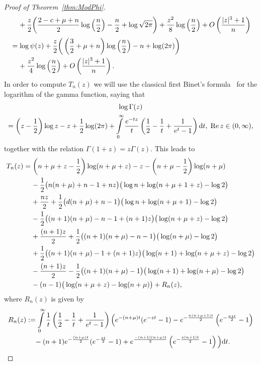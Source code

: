 \documentclass[AHL,Unicode,longabstracts,published]{cedram}
\newcommand{\dd}{{\rm d}}
\renewcommand{\Re}{\text{Re}\,}
\begin{document}
\begin{proof}[Proof of Theorem~\ref{thm:ModPhi}]
\begin{align*}
&\mkern20mu +\frac{z}{2}\bigg(\frac{2-c+\mu+n}{2}\log\left(\frac{n}{2}\right)-\frac{n}{2}+\log\sqrt{2\pi}\bigg)+\frac{z^2}{8}\log\left(\frac{n}{2}\right)+O\left(\frac{|z|^3+1}{n}\right)\\[0.20em]
&=\log \psi(z)+ \frac{z}{2}\bigg(\left(\frac{3}{2}+\mu+n\right)\log\left(\frac{n}{2}\right)-n+\log(2\pi)\bigg)\\
&\mkern20mu +\frac{z^2}{4}\log\left(\frac{n}{2}\right)+O\left(\frac{|z|^3+1}{n}\right).
\end{align*}
In order to compute $T_n(z)$ we will use the classical first Binet's formula~\cite[p.~243]{WW} for the logarithm of the gamma function, saying that
\begin{multline*}
\log \Gamma(z)\\
=\left(z-\frac{1}{2}\right)\log z-z+\frac{1}{2}\log(2\pi)+\int\limits_{0}^{\infty}\frac{e^{-tz}}{t}\left(\frac{1}{2}-\frac{1}{t}+\frac{1}{e^t-1}\right)\dd t,\; \Re z\in(0,\infty),
\end{multline*}
together with the relation $\Gamma(1+z)=z\Gamma(z)$. This leads to
\begin{align*}
T_n(z)&=\left(n+\mu+z-\frac{1}{2}\right)\log (n+\mu+z)-z-\left(n+\mu-\frac{1}{2}\right)\log (n+\mu)\\
&\mkern20mu -\frac{1}{2}\big(n(n+\mu)+n-1+nz\big)\big(\log n +\log (n+\mu+1+z)-\log 2\big)\\
&\mkern20mu +\frac{nz}{2}+\frac{1}{2}\big(d(n+\mu)+n-1\big)\big(\log n +\log (n+\mu+1)-\log 2\big)\\
&\mkern20mu -\frac{1}{2}\big((n+1)(n+\mu)-n-1+(n+1)z\big)\big(\log(n+\mu+z)-\log 2\big)\\
&\mkern20mu +\frac{(n+1)z}{2}+\frac{1}{2}\big((n+1)(n+\mu)-n-1\big)\big(\log (n+\mu)-\log 2\big)\\
&\mkern20mu +\frac{1}{2}\big((n+1)(n+\mu)-1+(n+1)z\big)\big(\log (n+1)+\log(n+\mu+z)-\log 2\big)\\
&\mkern20mu -\frac{(n+1)z}{2}-\frac{1}{2}\big((n+1)(n+\mu)-1\big)\big(\log (n+1)+\log(n+\mu)-\log 2\big)\\
&\mkern20mu -(n-1)\big(\log(n+\mu+z)-\log(n+\mu)\big)+R_n(z),
\end{align*}
where $R_n(z)$ is given by
\begin{align*}
R_n(z)&:=\int\limits_{0}^{\infty}\frac{1}{t}\left(\frac{1}{2}-\frac{1}{t}+\frac{1}{e^t-1}\right)\Big(e^{-(n+\mu)t}(e^{-zt}-1)-e^{-\frac{n(n+\mu+1)t}{2}}\left(e^{-\frac{nzt}{2}}-1\right)\\
&\mkern20mu -(n+1)e^{-\frac{(n+\mu)t}{2}}(e^{-\frac{zt}{2}}-1)+e^\frac{-(n+1)(n+\mu)t}{2}\left(e^{-\frac{z(n+1)t}{2}}-1\right)\Big)\dd t.
\end{align*}



\end{proof}
\end{document}
